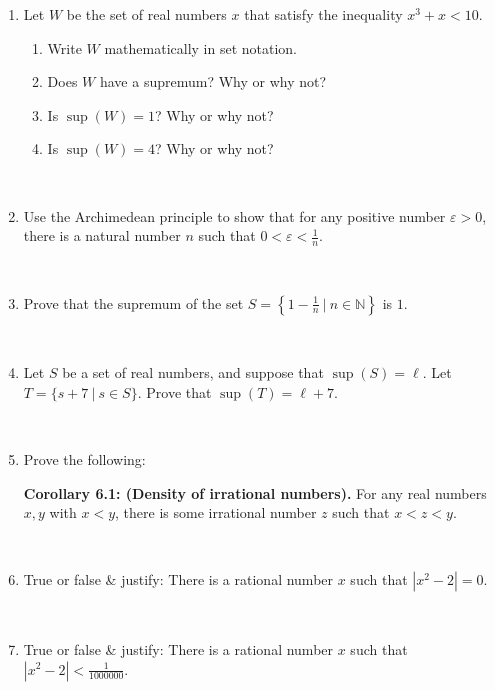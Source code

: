 \documentclass[12pt]{amsart}
\newcommand{\N}{\mathbb{N}}
\newcommand{\e}{\varepsilon}
\newcommand{\ds}{\displaystyle}
\begin{document}
\begin{enumerate}
\item Let $W$ be the set of real numbers $x$ that satisfy the inequality $x^3+x<10$.
\begin{enumerate}
\item Write $W$ mathematically in set notation.
\item Does $W$ have a supremum? Why or why not?
\item Is $\sup(W)=1$?  Why or why not?
\item Is $\sup(W)=4$?  Why or why not?
\end{enumerate}

\

\item Use the Archimedean principle to show that for any positive number $\e>0$, there is a natural number $n$ such that $\ds 0 < \e < \frac{1}{n}$.

\

\item Prove that the supremum of the set $\ds S= \left\{ 1 - \frac1n \ | \ n\in \N\right\}$ is $1$.

\

\item Let $S$ be a set of real numbers, and suppose that $\sup(S)=\ell$. Let $T=\{s+7 \ | \ s\in S\}$. Prove that $\sup(T) = \ell + 7$.

\

\item Prove the following:
\begin{framed}
\noindent \textbf{Corollary 6.1: (Density of irrational numbers).} For any real numbers $x,y$ with $x<y$, there is some irrational number $z$ such that $x<z<y$.
\end{framed}
\

\item True or false \& justify: There is a rational number $x$ such that $|x^2 - 2| = 0$.

\

\item True or false \& justify: There is a rational number $x$ such that $|x^2 - 2| < \frac{1}{1000000}$.


\end{enumerate}
\end{document}
